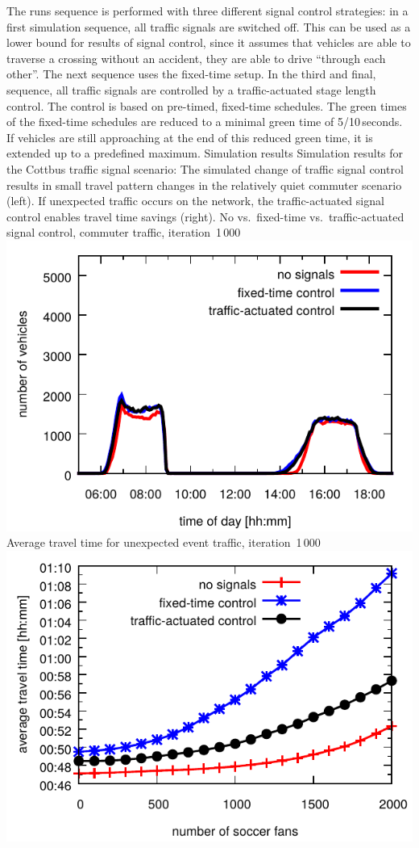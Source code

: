 The runs sequence is performed with three different signal control strategies:
in a first simulation sequence, all traffic signals are switched off. This can be used as a lower bound for results of signal control, since it assumes that vehicles are able to traverse a crossing without an accident, \ie they are able to drive ``through each other''. 
The next sequence uses the fixed-time setup. 
In the third and final, sequence, all traffic signals are controlled by a traffic-actuated stage length control. 
The control is based on pre-timed, fixed-time schedules. 
The green times of the fixed-time schedules are reduced to a minimal green time of 5/10\,seconds. 
If vehicles are still approaching at the end of this reduced green time, it is extended up to a predefined maximum. 
%
\createfigure%
{Simulation results}%
{Simulation results for the Cottbus traffic signal scenario: The simulated change of traffic signal control results in small travel pattern changes in the relatively quiet commuter scenario (left). If unexpected traffic occurs on the network, the traffic-actuated signal control enables travel time savings (right).}%
{\label{fig:results_histogram}}
{%
  \createsubfigure%
  {No vs.~fixed-time vs.~traffic-actuated signal control, commuter traffic, iteration~1\,000}%
	{\includegraphics[width=0.48\linewidth]{extending/figures/signalslanes/leg_histogram_cottbus_1292_1293_1291_it_1000_book.pdf}}
  {\label{fig:commuter_traffic}}%
  \createsubfigure%
	{Average travel time for unexpected event traffic, iteration~1\,000}
	{\includegraphics[width=0.48\linewidth]{extending/figures/signalslanes/average_travel_time_1220_1222_book.pdf}}
	{\label{fig:unexpected_event}}
}%
{\citet{Grether2014PhD}}

